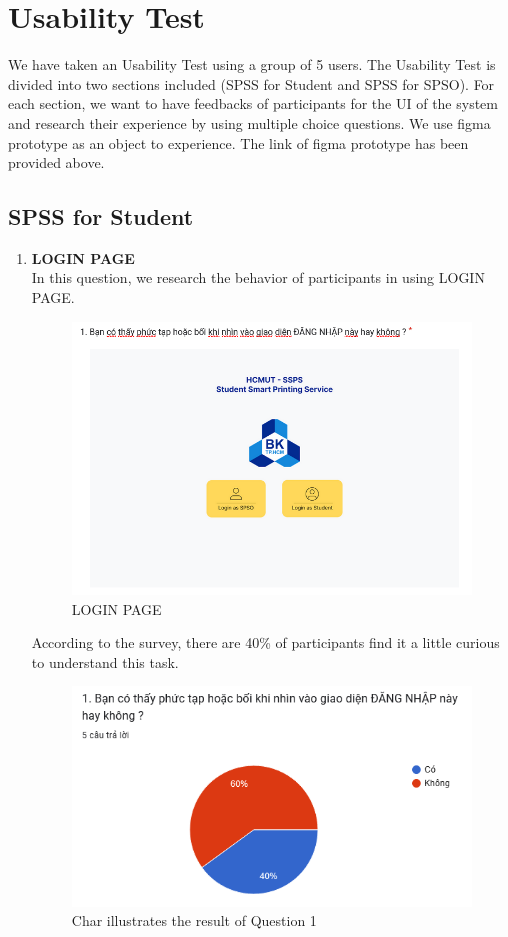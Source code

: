 \documentclass[a4paper]{report}
\begin{document}
\section{Usability Test}
We have taken an Usability Test using a group of 5 users. The Usability Test is divided into two sections included (SPSS for Student and SPSS for SPSO). For each section, we want to have feedbacks of participants for the UI of the system and research their experience by using multiple choice questions. We use figma prototype as an object to experience. The link of figma prototype has been provided above.
\subsection{SPSS for Student}
\begin{enumerate}
    \item \textbf{LOGIN PAGE} \\
    In this question, we research the behavior of participants in using LOGIN PAGE.
\begin{figure}[!h]
    \centering
    \includegraphics[width=0.8\linewidth]{images/image_uasbility/Q1_Stu.png}
    \caption{LOGIN PAGE}
    \label{fig:LOGIN PAGE}
\end{figure}
\newpage
According to the survey, there are 40\% of participants find it a little curious to understand this task.
\begin{figure}[!h]
    \centering
    \includegraphics[width=0.8\linewidth]{images/image_uasbility/A1_Stu.png}
    \caption{Char illustrates the result of Question 1}
    \label{fig:Chat illustrates the results of Question 1}
\end{figure}


\end{enumerate}
\end{document}
